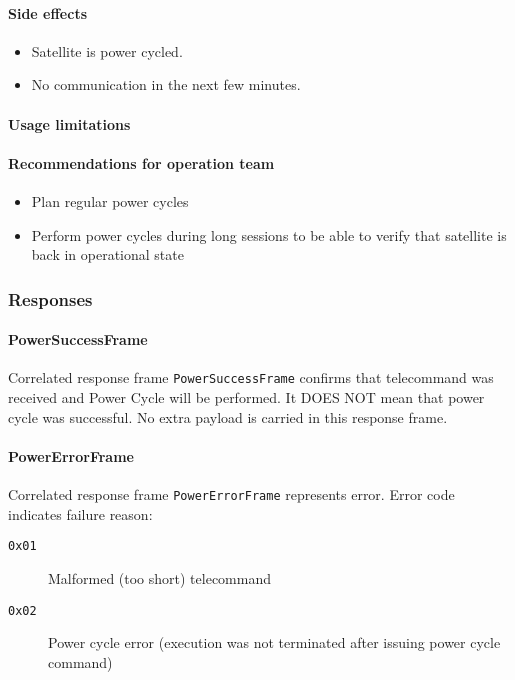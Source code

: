 \paragraph{Side effects}
\begin{itemize}
	\item Satellite is power cycled. 
	\item No communication in the next few minutes.
\end{itemize}

\paragraph{Usage limitations}
\None

\paragraph{Recommendations for operation team}
\begin{itemize}
	\item Plan regular power cycles
	\item Perform power cycles during long sessions to be able to verify that satellite is back in operational state
\end{itemize}

\subsubsection{Responses}

\paragraph{PowerSuccessFrame}
Correlated response frame \texttt{PowerSuccessFrame} confirms that telecommand was received and Power Cycle will be performed. It DOES NOT mean that power cycle was successful. No extra payload is carried in this response frame.

\paragraph{PowerErrorFrame}
Correlated response frame \texttt{PowerErrorFrame} represents error. Error code indicates failure reason:
\begin{description}
	\item[\texttt{0x01}] Malformed (too short) telecommand
	\item[\texttt{0x02}] Power cycle error (\OBC execution was not terminated after issuing power cycle command)
\end{description}

